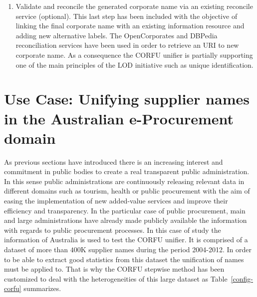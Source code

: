 \documentclass{llncs}
\begin{document}
\begin{enumerate}
\clearpage

\item Validate and reconcile the generated corporate name via an existing reconcile service (optional). This last 
step has been included with the objective of linking the final corporate name with an existing information 
resource and adding new alternative labels. The OpenCorporates and DBPedia reconciliation services have 
been used in order to retrieve an URI to new corporate name. As a consequence the CORFU unifier is partially supporting 
one of the main principles of the LOD initiative such as unique identification.
\end{enumerate}
% 
%


%
\section{Use Case: Unifying supplier names in the Australian e-Procurement domain}
As previous sections have introduced there is an increasing interest and commitment 
in public bodies to create a real transparent public administration. In this sense 
public administrations are continuously releasing relevant data in different domains 
such as tourism, health or public procurement with the aim of easing the implementation 
of new added-value services and improve their efficiency and transparency. In the particular 
case of public procurement, main and large administrations have already made publicly available the information 
with regards to public procurement processes. In this case of study the information of Australia is used 
to test the CORFU unifier. It is comprised of a dataset of more than $400$K supplier names during the period 2004-2012. In order to be able to extract 
good statistics from this dataset the unification of names must be applied to. That is why 
the CORFU stepwise method has been customized to deal with the heterogeneities of this large 
dataset as Table~\ref{config-corfu} summarizes.
\end{document}
